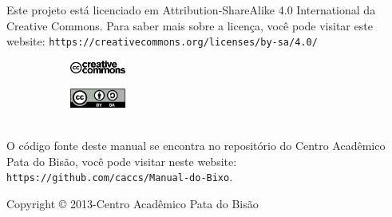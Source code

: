 \begin{center}
  Este projeto está licenciado em Attribution-ShareAlike 4.0 International da Creative Commons. Para saber mais sobre a licença, você pode visitar este website: \texttt{https://creativecommons.org/licenses/by-sa/4.0/}
~\\[\baselineskip]
  \begin{figure}[h]
    \centering
    \begin{subfigure}
      \centering
      \includegraphics[width=0.2\textwidth]{./imagem/cc_logo.pdf}
    \end{subfigure}
    \begin{subfigure}
      \centering
      \includegraphics[width=0.2\textwidth]{./imagem/by_sa.pdf}
    \end{subfigure}
  \end{figure}
~\\[\baselineskip]

  O código fonte deste manual se encontra no repositório do Centro Acadêmico Pata do Bisão, você pode visitar neste website: \texttt{https://github.com/caccs/Manual-do-Bixo}.


  \vfill Copyright © 2013-\the\year Centro Acadêmico Pata do Bisão
\end{center}
